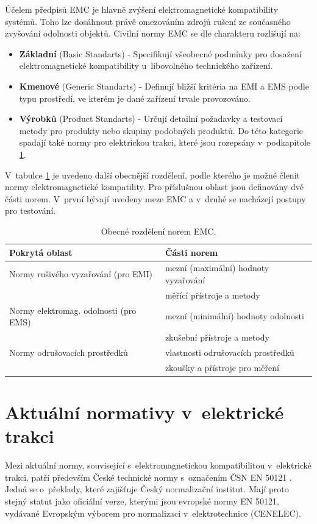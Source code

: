 Účelem předpisů EMC je hlavně zvýšení elektromagnetické kompatibility systémů. Toho lze dosáhnout právě omezováním zdrojů rušení ze současného zvyšování odolnosti objektů. Civilní normy EMC se dle charakteru rozlišují na:
\begin{itemize}
\item {\bf Základní} (Basic Standarts) - Specifikují všeobecné podmínky pro dosažení elektromagnetické kompatibility u~libovolného technického zařízení.
\item {\bf Kmenové} (Generic Standarts) - Definují bližší kritéria na EMI a EMS podle typu prostředí, ve kterém je dané zařízení trvale provozováno.
\item {\bf Výrobků} (Product Standarts) - Určují detailní požadavky a testovací metody pro produkty nebo skupiny podobných produktů. Do této kategorie spadají také normy pro elektrickou trakci, které jsou rozepsány v~podkapitole \ref{sec:emc_normy_trakce}.
\end{itemize}
V~tabulce \ref{tab:emc_deleni} je uvedeno další obecnější rozdělení, podle kterého je možné členit normy elektromagnetické kompatility. Pro příslušnou oblast jsou definovány dvě části norem. V~první bývají uvedeny meze EMC a v~druhé se nacházejí postupy pro testování.
\begin{table}[!h]
\begin{center}
  	\caption{Obecné rozdělení norem EMC.}
  	\label{tab:emc_deleni}
\begin{tabular}{|l|l|}
	\hline
	{\bf Pokrytá oblast}  & {\bf Části norem} \\
	\hline
	\hline
	Normy rušivého vyzařování  (pro EMI) & mezní (maximální) hodnoty vyzařování \\
	 & měřící přístroje a metody \\
	\hline
	Normy elektromag. odolnosti  (pro EMS) & mezní (minimální) hodnoty odolnosti \\
	 & zkušební přístroje a metody \\
	\hline
	Normy odrušovacích prostředků  & vlastnosti odrušovacích prostředků \\
	 & zkoušky a přístroje pro měření \\
	\hline
\end{tabular}
\end{center}
\end{table}
\newpage

\section{Aktuální normativy v~elektrické trakci} \label{sec:emc_normy_trakce}
Mezi aktuální normy, související s~elektromagnetickou kompatibilitou v~elektrické trakci, patří především České technické normy s~označením ČSN EN 50121 \cite{csn}. Jedná se o~překlady, které zajišťuje Český normalizační institut. Mají proto stejný statut jako oficiální verze, kterými jsou evropské normy EN 50121, vydávané Evropským výborem pro normalizaci v~elektrotechnice (CENELEC). 

